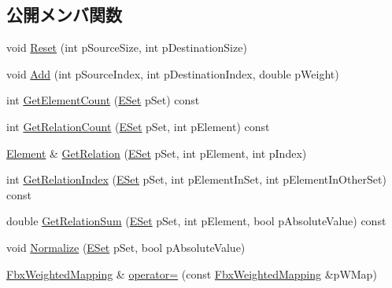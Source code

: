\subsection*{公開メンバ関数}
\begin{DoxyCompactItemize}
\item 
void \hyperlink{class_fbx_weighted_mapping_ae0bba66321c38e91d5910cfb0306dc57}{Reset} (int p\+Source\+Size, int p\+Destination\+Size)
\item 
void \hyperlink{class_fbx_weighted_mapping_a371482b940f4616b6f255309ed6be0aa}{Add} (int p\+Source\+Index, int p\+Destination\+Index, double p\+Weight)
\item 
int \hyperlink{class_fbx_weighted_mapping_a5037a5d025ca8544e453508e12aab6fb}{Get\+Element\+Count} (\hyperlink{class_fbx_weighted_mapping_a3fb59c162b0c5b278f00e7bad4c578c6}{E\+Set} p\+Set) const
\item 
int \hyperlink{class_fbx_weighted_mapping_aa7886f54860c52c0530a3813f99da400}{Get\+Relation\+Count} (\hyperlink{class_fbx_weighted_mapping_a3fb59c162b0c5b278f00e7bad4c578c6}{E\+Set} p\+Set, int p\+Element) const
\item 
\hyperlink{struct_fbx_weighted_mapping_1_1_element}{Element} \& \hyperlink{class_fbx_weighted_mapping_a7bfbaef7f0113abda83e7b6bbbe34859}{Get\+Relation} (\hyperlink{class_fbx_weighted_mapping_a3fb59c162b0c5b278f00e7bad4c578c6}{E\+Set} p\+Set, int p\+Element, int p\+Index)
\item 
int \hyperlink{class_fbx_weighted_mapping_a0903c7af1875b82c0c1edcc315d0ad3b}{Get\+Relation\+Index} (\hyperlink{class_fbx_weighted_mapping_a3fb59c162b0c5b278f00e7bad4c578c6}{E\+Set} p\+Set, int p\+Element\+In\+Set, int p\+Element\+In\+Other\+Set) const
\item 
double \hyperlink{class_fbx_weighted_mapping_a85e417a74b9c1cc40c04ff95ba0c0b5d}{Get\+Relation\+Sum} (\hyperlink{class_fbx_weighted_mapping_a3fb59c162b0c5b278f00e7bad4c578c6}{E\+Set} p\+Set, int p\+Element, bool p\+Absolute\+Value) const
\item 
void \hyperlink{class_fbx_weighted_mapping_a874bbc1592ffd77932008e3ea79cbdf8}{Normalize} (\hyperlink{class_fbx_weighted_mapping_a3fb59c162b0c5b278f00e7bad4c578c6}{E\+Set} p\+Set, bool p\+Absolute\+Value)
\item 
\hyperlink{class_fbx_weighted_mapping}{Fbx\+Weighted\+Mapping} \& \hyperlink{class_fbx_weighted_mapping_a7cf51cc13e95c389364fbfb8d7847c2d}{operator=} (const \hyperlink{class_fbx_weighted_mapping}{Fbx\+Weighted\+Mapping} \&p\+W\+Map)
\end{DoxyCompactItemize}
